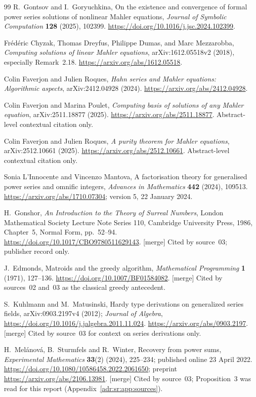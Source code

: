 \documentclass[11pt,letterpaper]{article}
\numberwithin{equation}{section}
\theoremstyle{definition}
\theoremstyle{remark}
\newcommand{\mtag}{\textup{[merge]}}%
\begin{document}
\begin{thebibliography}{99}
R.~Gontsov and I.~Goryuchkina,
On the existence and convergence of formal power series solutions of
nonlinear Mahler equations,
\emph{Journal of Symbolic Computation} \textbf{128} (2025), 102399.
\url{https://doi.org/10.1016/j.jsc.2024.102399}.

Fr\'ed\'eric Chyzak, Thomas Dreyfus, Philippe Dumas, and Marc Mezzarobba,
\emph{Computing solutions of linear Mahler equations},
arXiv:1612.05518v2 (2018), especially Remark~2.18.
\url{https://arxiv.org/abs/1612.05518}.

Colin Faverjon and Julien Roques,
\emph{Hahn series and Mahler equations: Algorithmic aspects},
arXiv:2412.04928 (2024).
\url{https://arxiv.org/abs/2412.04928}.

Colin Faverjon and Marina Poulet,
\emph{Computing basis of solutions of any Mahler equation},
arXiv:2511.18877 (2025).
\url{https://arxiv.org/abs/2511.18877}.
Abstract-level contextual citation only.

Colin Faverjon and Julien Roques,
\emph{A purity theorem for Mahler equations},
arXiv:2512.10661 (2025).
\url{https://arxiv.org/abs/2512.10661}.
Abstract-level contextual citation only.

Sonia L'Innocente and Vincenzo Mantova,
A factorisation theory for generalised power series and omnific integers,
\emph{Advances in Mathematics} \textbf{442} (2024), 109513.
\url{https://arxiv.org/abs/1710.07304}; version 5, 22 January 2024.

H.~Gonshor,
\emph{An Introduction to the Theory of Surreal Numbers},
London Mathematical Society Lecture Note Series 110, Cambridge University
Press, 1986, Chapter~5, Normal Form, pp.~52--94.
\url{https://doi.org/10.1017/CBO9780511629143}.
\mtag{} Cited by source~03; publisher record only.

J.~Edmonds,
Matroids and the greedy algorithm,
\emph{Mathematical Programming} \textbf{1} (1971), 127--136.
\url{https://doi.org/10.1007/BF01584082}.
\mtag{} Cited by sources~02 and~03 as the classical greedy antecedent.

S.~Kuhlmann and M.~Matusinski,
Hardy type derivations on generalized series fields,
arXiv:0903.2197v4 (2012); \emph{Journal of Algebra},
\url{https://doi.org/10.1016/j.jalgebra.2011.11.024}.
\url{https://arxiv.org/abs/0903.2197}.
\mtag{} Cited by source~03 for context on series derivations only.

H.~Mel\'anov\'a, B.~Sturmfels and R.~Winter,
Recovery from power sums,
\emph{Experimental Mathematics} \textbf{33}(2) (2024), 225--234; published
online 23 April 2022.
\url{https://doi.org/10.1080/10586458.2022.2061650};
preprint \url{https://arxiv.org/abs/2106.13981}.
\mtag{} Cited by source~03; Proposition~3 was read for this report
(Appendix~\ref{adr:sr:app:sources}).


\end{thebibliography}
\end{document}
